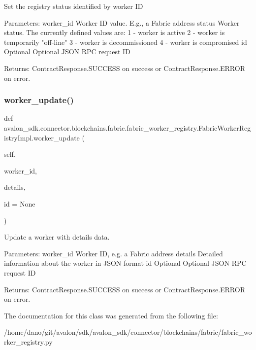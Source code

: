 \begin{DoxyVerb}Set the registry status identified by worker ID

Parameters:
worker_id Worker ID value. E.g., a Fabric address
status    Worker status. The currently defined values are:
  1 - worker is active
  2 - worker is temporarily "off-line"
  3 - worker is decommissioned
  4 - worker is compromised
id        Optional Optional JSON RPC request ID

Returns:
ContractResponse.SUCCESS on success
or ContractResponse.ERROR on error.
\end{DoxyVerb}
 \mbox{\label{classavalon__sdk_1_1connector_1_1blockchains_1_1fabric_1_1fabric__worker__registry_1_1FabricWorkerRegistryImpl_a070296571a578943d33d0aa5a570a18b}} 
\subsubsection{\texorpdfstring{worker\+\_\+update()}{worker\_update()}}
{\footnotesize\ttfamily def avalon\+\_\+sdk.\+connector.\+blockchains.\+fabric.\+fabric\+\_\+worker\+\_\+registry.\+Fabric\+Worker\+Registry\+Impl.\+worker\+\_\+update (\begin{DoxyParamCaption}\item[{}]{self,  }\item[{}]{worker\+\_\+id,  }\item[{}]{details,  }\item[{}]{id = {\ttfamily None} }\end{DoxyParamCaption})}

\begin{DoxyVerb}Update a worker with details data.

Parameters:
worker_id  Worker ID, e.g. a Fabric address
details    Detailed information about the worker in JSON format
id         Optional Optional JSON RPC request ID

Returns:
ContractResponse.SUCCESS on success
or ContractResponse.ERROR on error.
\end{DoxyVerb}
 

The documentation for this class was generated from the following file\+:\begin{DoxyCompactItemize}
\item 
/home/dano/git/avalon/sdk/avalon\+\_\+sdk/connector/blockchains/fabric/fabric\+\_\+worker\+\_\+registry.\+py\end{DoxyCompactItemize}
